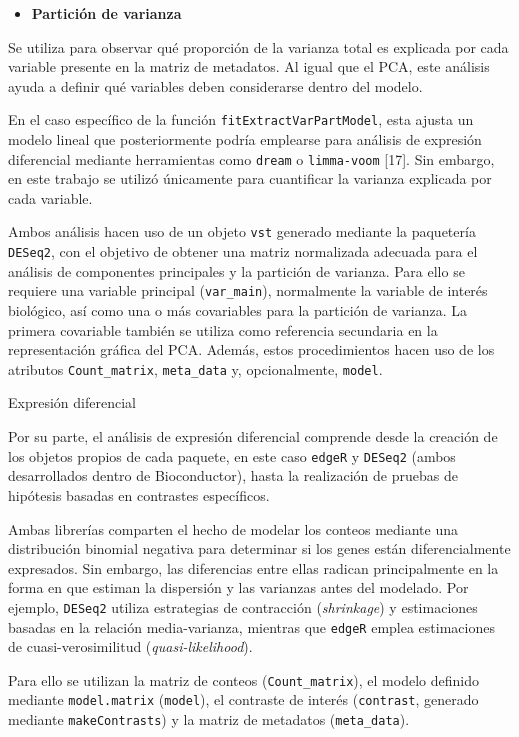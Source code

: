 \documentclass[
  10pt,
]{article}
\providecommand{\tightlist}{%
  \setlength{\itemsep}{0pt}\setlength{\parskip}{0pt}}
\begin{document}
\begin{itemize}
\tightlist
\item
  \textbf{Partición de varianza}
\end{itemize}

Se utiliza para observar qué proporción de la varianza total es
explicada por cada variable presente en la matriz de metadatos. Al igual
que el PCA, este análisis ayuda a definir qué variables deben
considerarse dentro del modelo.

En el caso específico de la función \texttt{fitExtractVarPartModel},
esta ajusta un modelo lineal que posteriormente podría emplearse para
análisis de expresión diferencial mediante herramientas como
\texttt{dream} o \texttt{limma-voom} {[}17{]}. Sin embargo, en este
trabajo se utilizó únicamente para cuantificar la varianza explicada por
cada variable.

Ambos análisis hacen uso de un objeto \texttt{vst} generado mediante la
paquetería \texttt{DESeq2}, con el objetivo de obtener una matriz
normalizada adecuada para el análisis de componentes principales y la
partición de varianza. Para ello se requiere una variable principal
(\texttt{var\_main}), normalmente la variable de interés biológico, así
como una o más covariables para la partición de varianza. La primera
covariable también se utiliza como referencia secundaria en la
representación gráfica del PCA. Además, estos procedimientos hacen uso
de los atributos \texttt{Count\_matrix}, \texttt{meta\_data} y,
opcionalmente, \texttt{model}.

Expresión diferencial

Por su parte, el análisis de expresión diferencial comprende desde la
creación de los objetos propios de cada paquete, en este caso
\texttt{edgeR} y \texttt{DESeq2} (ambos desarrollados dentro de
Bioconductor), hasta la realización de pruebas de hipótesis basadas en
contrastes específicos.

Ambas librerías comparten el hecho de modelar los conteos mediante una
distribución binomial negativa para determinar si los genes están
diferencialmente expresados. Sin embargo, las diferencias entre ellas
radican principalmente en la forma en que estiman la dispersión y las
varianzas antes del modelado. Por ejemplo, \texttt{DESeq2} utiliza
estrategias de contracción (\emph{shrinkage}) y estimaciones basadas en
la relación media-varianza, mientras que \texttt{edgeR} emplea
estimaciones de cuasi-verosimilitud (\emph{quasi-likelihood}).

Para ello se utilizan la matriz de conteos (\texttt{Count\_matrix}), el
modelo definido mediante \texttt{model.matrix} (\texttt{model}), el
contraste de interés (\texttt{contrast}, generado mediante
\texttt{makeContrasts}) y la matriz de metadatos (\texttt{meta\_data}).
\end{document}
